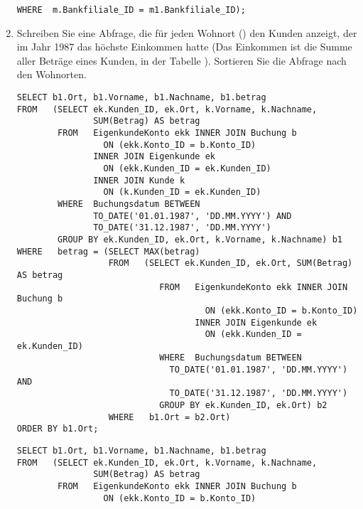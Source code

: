 \begin{enumerate}
\begin{lstlisting}[language=ms_sql]
                 WHERE  m.Bankfiliale_ID = m1.Bankfiliale_ID);
        \end{lstlisting}
        \item Schreiben Sie eine Abfrage, die für jeden Wohnort
        () den Kunden anzeigt, der im Jahr 1987 das
        höchste Einkommen hatte (Das Einkommen ist die Summe aller Beträge
        eines Kunden, in der Tabelle ). Sortieren Sie die
        Abfrage nach den Wohnorten.
        \begin{oraclesql}[\FALSE]
        \end{oraclesql}
        \begin{lstlisting}[language=oracle_sql]
SELECT b1.Ort, b1.Vorname, b1.Nachname, b1.betrag
FROM   (SELECT ek.Kunden_ID, ek.Ort, k.Vorname, k.Nachname,
               SUM(Betrag) AS betrag
        FROM   EigenkundeKonto ekk INNER JOIN Buchung b
                 ON (ekk.Konto_ID = b.Konto_ID)
               INNER JOIN Eigenkunde ek
                 ON (ekk.Kunden_ID = ek.Kunden_ID)
               INNER JOIN Kunde k
                 ON (k.Kunden_ID = ek.Kunden_ID)
        WHERE  Buchungsdatum BETWEEN
               TO_DATE('01.01.1987', 'DD.MM.YYYY') AND
               TO_DATE('31.12.1987', 'DD.MM.YYYY')
        GROUP BY ek.Kunden_ID, ek.Ort, k.Vorname, k.Nachname) b1
WHERE   betrag = (SELECT MAX(betrag)
                  FROM   (SELECT ek.Kunden_ID, ek.Ort, SUM(Betrag) AS betrag
                            FROM   EigenkundeKonto ekk INNER JOIN Buchung b
                                     ON (ekk.Konto_ID = b.Konto_ID)
                                   INNER JOIN Eigenkunde ek
                                     ON (ekk.Kunden_ID = ek.Kunden_ID)
                            WHERE  Buchungsdatum BETWEEN
                              TO_DATE('01.01.1987', 'DD.MM.YYYY') AND
                              TO_DATE('31.12.1987', 'DD.MM.YYYY')
                            GROUP BY ek.Kunden_ID, ek.Ort) b2
                  WHERE   b1.Ort = b2.Ort)
ORDER BY b1.Ort;
        \end{lstlisting}
\clearpage
        \begin{mssql}[\FALSE]
        \end{mssql}
        \begin{lstlisting}[language=ms_sql]
SELECT b1.Ort, b1.Vorname, b1.Nachname, b1.betrag
FROM   (SELECT ek.Kunden_ID, ek.Ort, k.Vorname, k.Nachname,
               SUM(Betrag) AS betrag
        FROM   EigenkundeKonto ekk INNER JOIN Buchung b
                 ON (ekk.Konto_ID = b.Konto_ID)

\end{lstlisting}
\end{enumerate}
